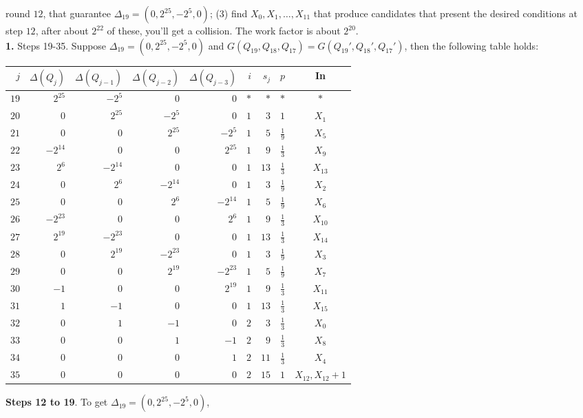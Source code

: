 round $12$, that guarantee $\Delta_{19}= (0, 2^{25}, -2^5,0)$; (3)
find $X_0, X_1, \ldots , X_{11}$ that produce candidates that present the desired
conditions at step $12$, after about $2^{22}$ of these, you'll get a collision.
The work factor is about $2^{20}$. \\
{\bf 1.}  Steps 19-35.  Suppose 
$\Delta_{19}= (0, 2^{25}, -2^5,0)$ and 
$G(Q_{19}, Q_{18}, Q_{17})= G(Q_{19}', Q_{18}', Q_{17}')$, then the following table
holds:
\begin{center}
\begin{tabular} {|r|rrrr|rrcc|}
\hline
$j$&$\Delta(Q_{j})$&$\Delta(Q_{j-1})$&$\Delta(Q_{j-2})$&$\Delta(Q_{j-3})$&$i$&$s_j$&$p$&In\\
\hline
$19$& $2^{25}$&$-2^5$&$0$&$0$&$*$&$*$&$*$&$*$\\
$20$& $0$&$2^{25}$&$-2^5$&$0$&$1$&$3$&$1$&$X_{1}$\\
$21$& $0$&$0$&$2^{25}$&$-2^5$& $1$&$5$&${\frac 1 9}$&$X_{5}$\\
$22$& $-2^{14}$&$0$&$0$&$2^{25}$& $1$&$9$&${\frac 1 3}$&$X_{9}$\\
$23$& $2^6$&$-2^{14}$&$0$&$0$& $1$&$13$&${\frac 1 3}$&$X_{13}$\\
$24$& $0$&$2^6$&$-2^{14}$&$0$& $1$&$3$&${\frac 1 9}$&$X_{2}$\\
$25$& $0$&$0$&$2^6$&$-2^{14}$& $1$&$5$&${\frac 1 9}$&$X_{6}$\\
$26$& $-2^{23}$&$0$&$0$&$2^6$& $1$&$9$&${\frac 1 3}$&$X_{10}$\\
$27$& $2^{19}$&$-2^{23}$&$0$&$0$& $1$&$13$&${\frac 1 3}$&$X_{14}$\\
$28$& $0$&$2^{19}$&$-2^{23}$&$0$& $1$&$3$&${\frac 1 9}$&$X_{3}$\\
$29$& $0$&$0$&$2^{19}$&$-2^{23}$& $1$&$5$&${\frac 1 9}$&$X_{7}$\\
$30$& $-1$&$0$&$0$&$2^{19}$& $1$&$9$&${\frac 1 3}$&$X_{11}$\\
$31$& $1$&$-1$&$0$&$0$& $1$&$13$&${\frac 1 3}$&$X_{15}$\\
$32$& $0$&$1$&$-1$&$0$& $2$&$3$&${\frac 1 3}$&$X_{0}$\\
$33$& $0$&$0$&$1$&$-1$& $2$&$9$&${\frac 1 3}$&$X_{8}$\\
$34$& $0$&$0$&$0$&$1$& $2$&$11$&${\frac 1 3}$&$X_{4}$\\
$35$& $0$&$0$&$0$&$0$& $2$&$15$&$1$&$X_{12}, X_{12}+1$\\
\hline
\end{tabular}
\end{center}
{\bf Steps 12 to 19}.
To get $\Delta_{19}= (0, 2^{25}, -2^5,0)$,
